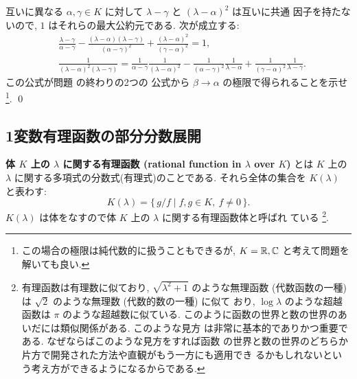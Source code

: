 \documentclass[12pt,twoside]{jarticle}
\begin{document}
\begin{question}
\label{q:Lagrange-interpolation-5}
  互いに異なる $\alpha,\gamma\in K$ に対して
  $\lambda-\gamma$ と $(\lambda-\alpha)^2$ は互いに共通
  因子を持たないので, $1$ はそれらの最大公約元である. 
  次が成立する:
  \begin{align*}
    &
     \frac{\lambda-\gamma}{\alpha-\gamma}
    -\frac{(\lambda-\alpha)(\lambda-\gamma)}{(\alpha-\gamma)^2}
    +\frac{(\lambda-\alpha)^2}{(\gamma-\alpha)^2}
    = 1,
    \\ &
    \frac{1}{(\lambda-\alpha)^2(\lambda-\gamma)}
    =
     \frac{1}{\alpha-\gamma}
     \frac{1}{(\lambda-\alpha)^2}
    -\frac{1}{(\alpha-\gamma)^2}
     \frac{1}{\lambda-\alpha}
    +\frac{1}{(\gamma-\alpha)^2}
     \frac{1}{\lambda-\gamma}.
  \end{align*}
  この公式が問題  の終わりの2つの
  公式から $\beta\to\alpha$ の極限で得られることを示せ%
  \footnote{この場合の極限は純代数的に扱うこともできるが,
    $K={\mathbb R},{\mathbb C}$ と考えて問題を解いても良い.}.
  \qed
\end{question}


\subsection{1変数有理函数の部分分数展開}
\label{sec:partial-fraction}


{\bf 体 $K$ 上の $\lambda$ に関する有理函数 (rational function in $\lambda$
over $K$)} とは $K$ 上の $\lambda$ に関する多項式の分数式(有理式)のことである. 
それら全体の集合を $K(\lambda)$ と表わす:
\begin{equation*}
  K(\lambda) = \{\, g/f \mid f,g\in K,\ f\ne 0 \,\}.
\end{equation*}
$K(\lambda)$ は体をなすので体 $K$ 上の $\lambda$ に関する有理函数体と呼ばれ
ている%
\footnote{有理函数は有理数に似ており, $\sqrt{\lambda^2+1}$ のような無理函数
  (代数函数の一種) は $\sqrt{2}$ のような無理数 (代数的数の一種) に似て
  おり, $\log\lambda$ のような超越函数は $\pi$ のような超越数に似ている.  
  このように函数の世界と数の世界のあいだには類似関係がある.  このような見方
  は非常に基本的でありかつ重要である.  なぜならばこのような見方をすれば函数
  の世界と数の世界のどちらか片方で開発された方法や直観がもう一方にも適用でき
  るかもしれないという考え方ができるようになるからである.}.
\end{document}
